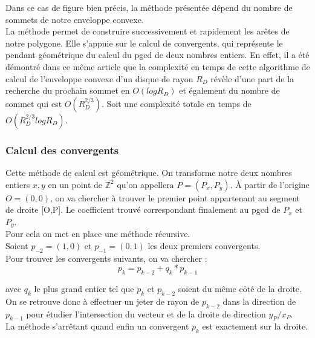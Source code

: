 Dans ce cas de figure bien précis, la méthode présentée dépend du nombre de sommets de notre enveloppe convexe. \\

La méthode permet de construire successivement et rapidement les arêtes de notre polygone. Elle s'appuie sur le calcul de convergents, qui représente le pendant géométrique du calcul du pgcd de deux nombres entiers. 
En effet, il a été démontré dans ce même article que la complexité en temps de cette algorithme de calcul de l'enveloppe convexe d'un disque de rayon $R_D$ révèle d'une part de la recherche du prochain sommet en $O(log R_D)$ et également du nombre de sommet qui est $O( R_{D}^{2/3})$. Soit une complexité totale en temps de  $O( R_{D}^{2/3} log R_D)$.


\subsubsection{Calcul des convergents}

Cette méthode de calcul est géométrique. On transforme notre deux nombres entiers $x, y$ en un point de $\mathbb{Z}^{2}$ qu'on appellera $P = (P_x, P_y)$. À partir de l’origine $O=(0,0)$, on va chercher à trouver le premier point appartenant au segment de droite [O,P]. Le coefficient trouvé correspondant finalement au pgcd de $P_x$ et $P_y$.\\

Pour cela on met en place une méthode récursive.\\
Soient $p_{-2} = (1,0)$ et $p_{-1} = (0,1)$ les deux premiers convergents.\\

Pour trouver les convergents suivants, on va chercher :
$$p_{k} = p_{k-2} + q_k * p_{k-1}$$

avec $q_k$ le plus grand entier tel que $p_{k}$ et $p_{k-2}$ soient du même côté de la droite.\\

On se retrouve donc à effectuer un jeter de rayon de $p_{k-2}$ dans la direction de $p_{k-1}$ pour étudier l’intersection du vecteur et de la droite de direction $y_P / x_P$.\\

La méthode s’arrêtant quand enfin un convergent $p_{k}$ est exactement sur la droite.



